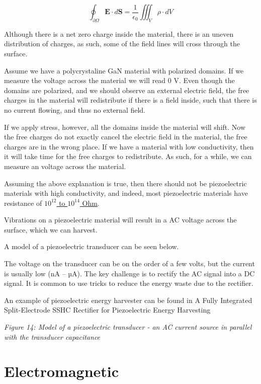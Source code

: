 \[ \oint_{\partial \Omega} \mathbf{E} \cdot d\mathbf{S} = \frac{1}{\epsilon_0} \iiint_{V} \rho
\cdot dV\]

Although there is a net zero charge inside the material, there is an
uneven distribution of charges, as such, some of the field lines will
cross through the surface.

Assume we have a polycrystaline GaN material with polarized domains. If
we measure the voltage across the material we will read 0 V. Even though
the domains are polarized, and we should observe an external electric
field, the free charges in the material will redistribute if there is a
field inside, such that there is no current flowing, and thus no
external field.

If we apply stress, however, all the domains inside the material will
shift. Now the free charges do not exactly cancel the electric field in
the material, the free charges are in the wrong place. If we have a
material with low conductivity, then it will take time for the free
charges to redistribute. As such, for a while, we can measure an voltage
across the material.

Assuming the above explanation is true, then there should not be
piezoelectric materials with high conductivity, and indeed, most
piezoelectric materials have resistance of
\href{https://www.f3lix-tutorial.com/piezo-materials}{\(10^{12}\) to
\(10^{14}\) Ohm}.

Vibrations on a piezoelectric material will result in a AC voltage
across the surface, which we can harvest.

A model of a piezoelectric transducer can be seen below.

The voltage on the transducer can be on the order of a few volts, but
the current is usually low (nA -- µA). The key challenge is to rectify
the AC signal into a DC signal. It is common to use tricks to reduce the
energy waste due to the rectifier.

An example of piezoelectric energy harvester can be found in A Fully
Integrated Split-Electrode SSHC Rectifier for Piezoelectric Energy
Harvesting 


{
\centering
{}
}

\emph{Figure 14: Model of a piezoelectric transducer - an AC current
source in parallel with the transducer capacitance}

\section{Electromagnetic}\label{electromagnetic}


